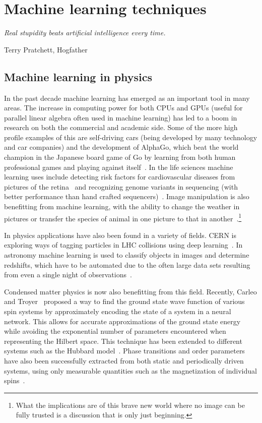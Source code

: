 \documentclass[11pt, a4paper]{report} %
\begin{document}
\chapter{Machine learning techniques}\label{chap:machine_learning}

\epigraph{\textit{Real stupidity beats artificial intelligence every time.}}{Terry Pratchett, Hogfather}

\section{Machine learning in physics}

In the past decade machine learning has emerged as an important tool in many areas.
The increase in computing power for both CPUs and GPUs (useful for parallel linear algebra often used in machine learning) has led to a boom in research on both the commercial and academic side.
Some of the more high profile examples of this are self-driving cars (being developed by many technology and car companies) and the development of AlphaGo, which beat the world champion in the Japanese board game of Go by learning from both human professional games and playing against itself~\cite{Silver2017a,Silver2017,silver16_master_game_go_with_deep}.
In the life sciences machine learning uses include detecting risk factors for cardiovascular diseases from pictures of the retina~\cite{poplin17_predic_cardiov_risk_factor_from} and recognizing genome variants in sequencing (with better performance than hand crafted sequencers)~\cite{Poplin2016}.
Image manipulation is also benefitting from machine learning, with the ability to change the weather in pictures or transfer the species of animal in one picture to that in another~\cite{Liu2017}.\footnote{What the implications are of this brave new world where no image can be fully trusted is a discussion that is only just beginning.}

In physics applications have also been found in a variety of fields.
CERN is exploring ways of tagging particles in LHC collisions using deep learning~\cite{paganini17_machin_learn_algor_jet_taggin}.
In astronomy machine learning is used to classify objects in images and determine redshifts, which have to be automated due to the often large data sets resulting from even a single night of observations~\cite{ball10_data_minin_and_machin_learn_in_astron}.

Condensed matter physics is now also benefitting from this field.
Recently, Carleo and Troyer~\cite{Carleo2017} proposed a way to find the ground state wave function of various spin systems by approximately encoding the state of a system in a neural network. This allows for accurate approximations of the ground state energy while avoiding the exponential number of parameters encountered when representing the Hilbert space.
This technique has been extended to different systems such as the Hubbard model~\cite{Saito2017}.
Phase transitions and order parameters have also been successfully extracted from both static and periodically driven systems, using only measurable quantities such as the magnetization of individual spins~\cite{Nieuwenburg2017}.
\end{document}

